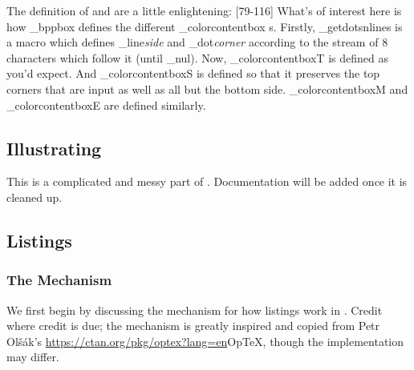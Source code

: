 The definition of \macro\bppbox{} and \macro\eppbox{} are a little enlightening:
[79-116]
What's of interest here is how \macro\_bppbox{} defines the different \macro\_colorcontentbox s.
Firstly, \macro\_getdotsnlines{} is a macro which defines \macro\_line{\it side} and \macro\_dot{\it corner} according to the stream of $8$ characters which follow it (until \macro\_nul).
Now, \macro\_colorcontentboxT{} is defined as you'd expect.
And \macro\_colorcontentboxS{} is defined so that it preserves the top corners that are input as well as all but the bottom side.
\macro\_colorcontentboxM{} and \macro\_colorcontentboxE{} are defined similarly.

\subsection{Illustrating} 

\bwarning
This is a complicated and messy part of \pdftoolbox.
Documentation will be added once it is cleaned up.
\eppbox

\subsection{Listings} 

\subsubsection{The Mechanism}

We first begin by discussing the mechanism for how listings work in \pdftoolbox.
Credit where credit is due; the mechanism is greatly inspired and copied from Petr Ol\v s\'ak's \url{https://ctan.org/pkg/optex?lang=en}{Op\TeX}, though the implementation may differ.

